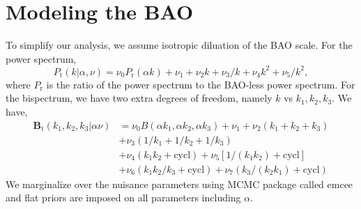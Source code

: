 \section{Modeling the BAO}
To simplify our analysis, we assume isotropic diluation of the BAO scale. For the power spectrum,
\begin{equation}
    P_\mathrm{t}(k|\alpha,\nu) = \nu_{0} P_\mathrm{r}(\alpha k) + \nu_{1} + \nu_{2}k + \nu_{3}/k + \nu_{4}k^{2} + \nu_{5}/k^{2},
\end{equation}
where $P_\mathrm{r}$ is the ratio of the power spectrum to the BAO-less power spectrum. For the bispectrum, we have two extra degrees of freedom, namely $k$ vs $k_{1}, k_{2}, k_{3}$. We have,
\begin{align}
    \mathbf{B}_\mathrm{t}(k_{1}, k_{2}, k_{3}|\alpha \nu) &= \nu_{0}B(\alpha k_{1}, \alpha k_{2}, \alpha k_{3}) + \nu_{1} + \nu_{2}(k_{1}+k_{2}+k_{3})\nonumber\\
    &+ \nu_{3}(1/k_{1}+1/k_{2}+1/k_{3})\nonumber\\
    &+\nu_{4}(k_{1}k_{2}+ \text{cycl})+\nu_{5}[1/(k_{1}k_{2})+ \text{cycl}]\nonumber\\
    &+\nu_{6}(k_{1}k_{2}/k_{3}+\text{cycl})+\nu_{7}(k_{3}/(k_{2}k_{1})+\text{cycl})
\end{align}
We marginalize over the nuisance parameters using MCMC package called emcee and flat priors are imposed on all parameters including $\alpha$.